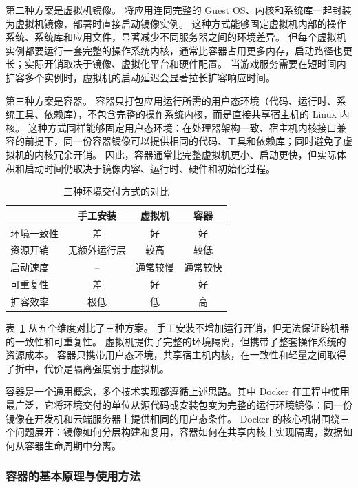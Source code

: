 第二种方案是虚拟机镜像。
将应用连同完整的 Guest OS、内核和系统库一起封装为虚拟机镜像，部署时直接启动镜像实例。
这种方式能够固定虚拟机内部的操作系统、系统库和应用文件，显著减少不同服务器之间的环境差异。
但每个虚拟机实例都要运行一套完整的操作系统内核，通常比容器占用更多内存，启动路径也更长；实际开销取决于镜像、虚拟化平台和硬件配置。
当游戏服务需要在短时间内扩容多个实例时，虚拟机的启动延迟会显著拉长扩容响应时间。

第三种方案是容器。
容器只打包应用运行所需的用户态环境（代码、运行时、系统工具、依赖库），不包含完整的操作系统内核，而是直接共享宿主机的 Linux 内核。
这种方式同样能够固定用户态环境：在处理器架构一致、宿主机内核接口兼容的前提下，同一份容器镜像可以提供相同的代码、工具和依赖库；同时避免了虚拟机的内核冗余开销。
因此，容器通常比完整虚拟机更小、启动更快，但实际体积和启动时间仍取决于镜像内容、运行时、硬件和初始化过程。

\begin{table}[htbp]
\centering
\begin{tabular}{|l|c|c|c|}
\hline
 & 手工安装 & 虚拟机 & 容器 \\
\hline
环境一致性 & 差 & 好 & 好 \\
\hline
资源开销 & 无额外运行层 & 较高 & 较低 \\
\hline
启动速度 & -- & 通常较慢 & 通常较快 \\
\hline
可重复性 & 差 & 好 & 好 \\
\hline
扩容效率 & 极低 & 低 & 高 \\
\hline
\end{tabular}
\caption{三种环境交付方式的对比}
\label{tab:env-delivery-comparison}
\end{table}

表~\ref{tab:env-delivery-comparison} 从五个维度对比了三种方案。
手工安装不增加运行开销，但无法保证跨机器的一致性和可重复性。
虚拟机提供了完整的环境隔离，但携带了整套操作系统的资源成本。
容器只携带用户态环境，共享宿主机内核，在一致性和轻量之间取得了折中，代价是隔离强度弱于虚拟机。

容器是一个通用概念，多个技术实现都遵循上述思路。其中 Docker 在工程中使用最广泛，它将环境交付的单位从源代码或安装包变为完整的运行环境镜像：同一份镜像在开发机和云端服务器上提供相同的用户态条件。
Docker 的核心机制围绕三个问题展开：镜像如何分层构建和复用，容器如何在共享内核上实现隔离，数据如何从容器生命周期中分离。

\subsubsection{容器的基本原理与使用方法}\label{sec5:docker-containers}

